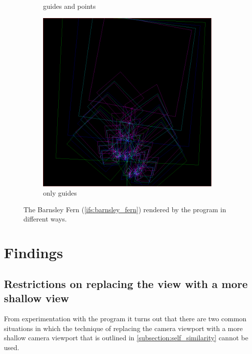 \documentclass[11pt]{article}
\begin{document}
\begin{figure}
\begin{subfigure}[b]{0.3\textwidth}
         \caption{guides and points}
         \label{figure:barnsley_guides_and_points}
     \end{subfigure}
     \hfill
     \begin{subfigure}[b]{0.3\textwidth}
         \centering
         \includegraphics[width=\textwidth]{figures/barnsley_guides}
         \caption{only guides}
         \label{figure:barnsley_guides}
     \end{subfigure}
        \caption{The Barnsley Fern (\autoref{ifs:barnsley_fern}) rendered by the program in different ways.}
        \label{figure:barnsley_guides_vs_points}
\end{figure}

\section{Findings}
\label{sec:org559db90}
\label{section:findings}

\subsection{Restrictions on replacing the view with a more shallow view}
\label{sec:org9031a15}
\label{subsection:jumping_restrictions}

From experimentation with the program it turns out that there are two common situations
in which the technique of replacing the camera viewport with a more shallow camera viewport that is outlined in \autoref{subsection:self_similarity} cannot be used.
\end{document}
